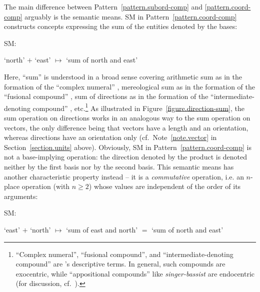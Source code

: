 \documentclass[output=paper
  ,nobabel
  ,draftmode
  ,colorlinks, citecolor=brown
]{langscibook}
\begin{document}
The main difference between Pattern \ref{pattern.subord-comp} and \ref{pattern.coord-comp} arguably is the semantic means. SM in Pattern \ref{pattern.coord-comp} constructs concepts expressing the
sum of the entities denoted by the bases: \begin{exe}
\ex \raggedright
\begin{labeledlist}{SM:}
\item[SM:] \raggedright ‘north’ $+$ ‘east’ $↦$ ‘sum of north and east’
\end{labeledlist}
\end{exe} 
Here, ``sum'' is understood in a broad
sense covering arithmetic sum as in the formation of the ``complex
numeral'' \emph{},
mereological sum as in the formation of the ``fusional
compound'' \emph{}, sum of directions as in the
formation of the ``intermediate-denoting compound'' \emph{}, etc.\footnote{``Complex numeral'', ``fusional
compound'', and ``intermediate-denoting
compound'' are \citeauthor{waelchli:2005:co-compounds:natural}’s \citeyearpar{waelchli:2005:co-compounds:natural} descriptive terms. In general,
such compounds are exocentric, while ``appositional compounds''
like  \emph{singer-bassist} are endocentric
(for discussion, cf.\ \citealt{olsen:2014:coordinative:structures}).} As illustrated in
Figure \ref{figure.direction-sum}, the sum operation on
directions works in an analogous way to the sum operation on vectors, the only
difference being that vectors have a length and an orientation, whereas
directions have an orientation only (cf.\ Note \ref{note.vector} in Section \ref{section.units}
above). Obviously, SM in Pattern \ref{pattern.coord-comp} is not a base-implying operation: the direction
denoted by the product is denoted neither by the first basis nor by the second
basis. This semantic means has another characteristic property instead – it is a
\emph{commutative} operation, i.e. an $n$-place operation (with $n≥2$) whose values are independent of the order of its arguments: \begin{exe}
\ex \raggedright
\begin{labeledlist}{SM:}
\item[SM:] \raggedright ‘east’ $+$ ‘north’ $↦$
‘sum of east and north’ $=$ ‘sum of north and east’
\end{labeledlist}
\end{exe}
\end{document}
